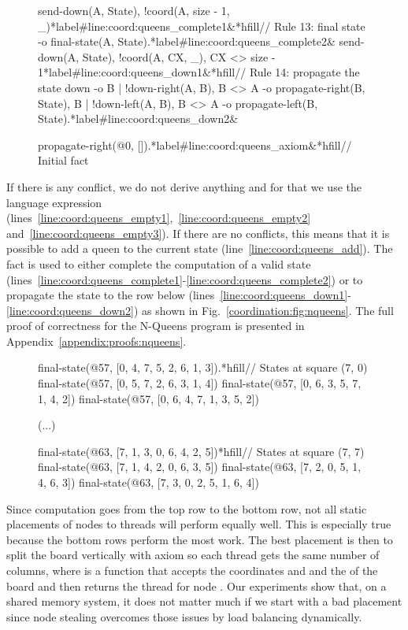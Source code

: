 \begin{figure}[h!]
\begin{LineCode}[fontsize=\scriptsize,commandchars=\*\#\&]
send-down(A, State), !coord(A, size - 1, _)*label#line:coord:queens_complete1&*hfill// Rule 13: final state
  -o final-state(A, State).*label#line:coord:queens_complete2&
send-down(A, State), !coord(A, CX, _), CX <> size - 1*label#line:coord:queens_down1&*hfill// Rule 14: propagate the state down
  -o {B | !down-right(A, B), B <> A -o propagate-right(B, State)},
     {B | !down-left(A, B), B <> A -o propagate-left(B, State)}.*label#line:coord:queens_down2&

propagate-right(@0, []).*label#line:coord:queens_axiom&*hfill// Initial fact
\end{LineCode}
  \label{code:coordination:nqueens}
\end{figure}

If there is any conflict, we do not derive anything and for that we use the
language expression 
(lines~\ref{line:coord:queens_empty1},~\ref{line:coord:queens_empty2}
and~\ref{line:coord:queens_empty3}). If there are no conflicts, this means that
it is possible to add a queen to the current state
(line~\ref{line:coord:queens_add}). The fact  is used to either
complete the computation of a valid state
(lines~\ref{line:coord:queens_complete1}-\ref{line:coord:queens_complete2}) or
to propagate the state to the row below
(lines~\ref{line:coord:queens_down1}-\ref{line:coord:queens_down2}) as shown in
Fig.~\ref{coordination:fig:nqueens}.
The full proof of correctness for
the N-Queens program is presented in Appendix~\ref{appendix:proofs:nqueens}.

\begin{figure}[h!]
\begin{LineCode}[commandchars=\*\#\&]
final-state(@57, [0, 4, 7, 5, 2, 6, 1, 3]).*hfill// States at square (7, 0)
final-state(@57, [0, 5, 7, 2, 6, 3, 1, 4])
final-state(@57, [0, 6, 3, 5, 7, 1, 4, 2])
final-state(@57, [0, 6, 4, 7, 1, 3, 5, 2])

(...)

final-state(@63, [7, 1, 3, 0, 6, 4, 2, 5])*hfill// States at square (7, 7)
final-state(@63, [7, 1, 4, 2, 0, 6, 3, 5])
final-state(@63, [7, 2, 0, 5, 1, 4, 6, 3])
final-state(@63, [7, 3, 0, 2, 5, 1, 6, 4])
\end{LineCode}
  \label{code:coordination:8queens}
\end{figure}

Since computation goes from the top row to the bottom row, not all static
placements of nodes to threads will perform equally well. This is especially
true because the bottom rows perform the most work.  The best placement is then
to split the board vertically with axiom  so each thread gets the same number of columns, where
 is a function that accepts the coordinates  and 
and the  of the board and then returns the thread for node .
Our experiments show that, on a shared memory system, it does not matter much if
we start with a bad placement since node stealing overcomes those issues by load
balancing dynamically.

